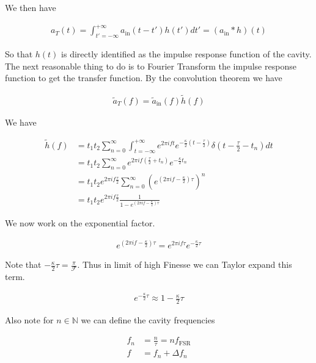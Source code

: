 \documentclass[12pt]{article}
\begin{document}
We then have

\begin{align}
a_T(t) = \int_{t'=-\infty}^{+\infty} a_{\text{in}}(t-t')h(t') dt' = \left(a_{\text{in}}\ast h\right)(t)
\end{align}

So that $h(t)$ is directly identified as the impulse response function of the cavity.
The next reasonable thing to do is to Fourier Transform the impulse response function to get the transfer function. By the convolution theorem we have

\begin{align}
\tilde{a}_T(f) = \tilde{a}_{\text{in}}(f) \tilde{h}(f)
\end{align}

We have

\begin{align}
\tilde{h}(f) &= t_1t_2\sum_{n=0}^{\infty} \int_{t = -\infty}^{+\infty} e^{2\pi i f t} e^{-\frac{\kappa}{2}\left(t-\frac{\tau}{2}\right)} \delta \left(t-\frac{\tau}{2} - t_n \right) dt\\
&=t_1t_2\sum_{n=0}^{\infty} e^{2\pi i f \left(\frac{\tau}{2} + t_n\right)} e^{-\frac{\kappa}{2} t_n}\\
&=t_1t_2 e^{2\pi i f \frac{\tau}{2}} \sum_{n=0}^{\infty} \left(e^{\left(2\pi i f - \frac{\kappa}{2}\right) \tau}\right)^n\\
&= t_1t_2 e^{2\pi i f \frac{\tau}{2}} \frac{1}{1-e^{\left(2\pi i f - \frac{\kappa}{2}\right) \tau}}
\end{align}

We now work on the exponential factor. 

\begin{align}
e^{\left(2\pi i f - \frac{\kappa}{2} \right) \tau} = e^{2\pi i f \tau} e^{-\frac{\kappa}{2}\tau}
\end{align}

Note that $-\frac{\kappa}{2}\tau = \frac{\pi}{\mathcal{F}}$. Thus in limit of high Finesse we can Taylor expand this term.

\begin{align}
e^{-\frac{\kappa}{2}\tau} \approx 1 - \frac{\kappa}{2}\tau
\end{align}

 Also note for $n \in \mathbb{N}$ we can define the cavity frequencies 

\begin{align}
f_n &= \frac{n}{\tau} = n f_{\text{FSR}}\\
f &= f_n + \Delta f_n
\end{align}
\end{document}
